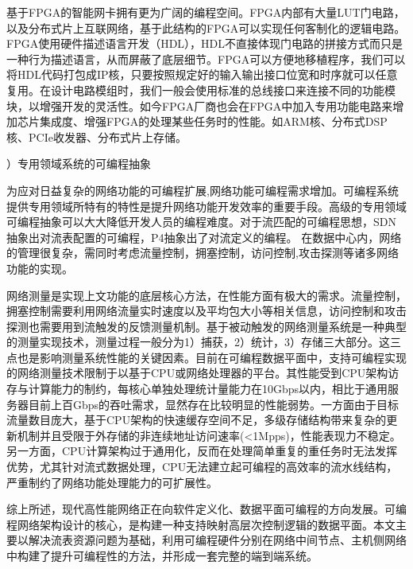 基于FPGA的智能网卡拥有更为广阔的编程空间。FPGA内部有大量LUT门电路，以及分布式片上互联网络，基于此结构的FPGA可以实现任何客制化的逻辑电路。FPGA使用硬件描述语言开发（HDL），HDL不直接体现门电路的拼接方式而只是一种行为描述语言，从而屏蔽了底层细节。FPGA可以方便地移植程序，我们可以将HDL代码打包成IP核，只要按照规定好的输入输出接口位宽和时序就可以任意复用。在设计电路模组时，我们一般会使用标准的总线接口来连接不同的功能模块，以增强开发的灵活性。如今FPGA厂商也会在FPGA中加入专用功能电路来增加芯片集成度、增强FPGA的处理某些任务时的性能。如ARM核、分布式DSP核、PCIe收发器、分布式片上存储。

{）专用领域系统的可编程抽象}



为应对日益复杂的网络功能的可编程扩展,网络功能可编程需求增加。可编程系统提供专用领域所特有的特性是提升网络功能开发效率的重要手段。高级的专用领域可编程抽象可以大大降低开发人员的编程难度。对于流匹配的可编程思想，SDN抽象出对流表配置的可编程，P4抽象出了对流定义的编程。
在数据中心内，网络的管理很复杂，需同时考虑流量控制，拥塞控制，访问控制,攻击探测等诸多网络功能的实现。



网络测量是实现上文功能的底层核心方法，在性能方面有极大的需求。流量控制，拥塞控制需要利用网络流量实时速度以及平均包大小等相关信息，访问控制和攻击探测也需要用到流触发的反馈测量机制。基于被动触发的网络测量系统是一种典型的测量实现技术，测量过程一般分为1）捕获，2）统计，3）存储三大部分。这三点也是影响测量系统性能的关键因素。目前在可编程数据平面中，支持可编程实现的网络测量技术限制于以基于CPU或网络处理器的平台。其性能受到CPU架构访存与计算能力的制约，每核心单独处理统计量能力在10Gbps以内，相比于通用服务器目前上百Gbps的吞吐需求，显然存在比较明显的性能弱势。一方面由于目标流量数目庞大，基于CPU架构的快速缓存空间不足，多级存储结构带来复杂的更新机制并且受限于外存储的非连续地址访问速率(<1Mpps)，性能表现力不稳定。另一方面，CPU计算架构过于通用化，反而在处理简单重复的重任务时无法发挥优势，尤其针对流式数据处理，CPU无法建立起可编程的高效率的流水线结构，严重制约了网络功能处理能力的可扩展性。


综上所述，现代高性能网络正在向软件定义化、数据平面可编程的方向发展。可编程网络架构设计的核心，是构建一种支持映射高层次控制逻辑的数据平面。本文主要以解决流表资源问题为基础，利用可编程硬件分别在网络中间节点、主机侧网络中构建了提升可编程性的方法，并形成一套完整的端到端系统。

